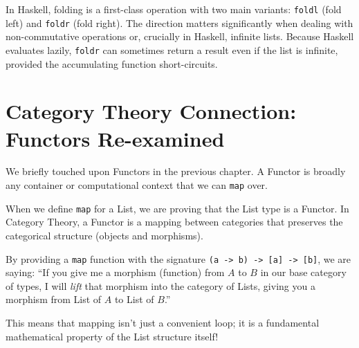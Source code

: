 In Haskell, folding is a first-class operation with two main variants: \texttt{foldl} (fold left) and \texttt{foldr} (fold right). The direction matters significantly when dealing with non-commutative operations or, crucially in Haskell, infinite lists. Because Haskell evaluates lazily, \texttt{foldr} can sometimes return a result even if the list is infinite, provided the accumulating function short-circuits.

\section{Category Theory Connection: Functors Re-examined}
We briefly touched upon Functors in the previous chapter. A Functor is broadly any container or computational context that we can \texttt{map} over.

When we define \texttt{map} for a List, we are proving that the List type is a Functor. In Category Theory, a Functor is a mapping between categories that preserves the categorical structure (objects and morphisms). 

By providing a \texttt{map} function with the signature \texttt{(a -> b) -> [a] -> [b]}, we are saying: ``If you give me a morphism (function) from $A$ to $B$ in our base category of types, I will \textit{lift} that morphism into the category of Lists, giving you a morphism from List of $A$ to List of $B$.''

This means that mapping isn't just a convenient loop; it is a fundamental mathematical property of the List structure itself!

